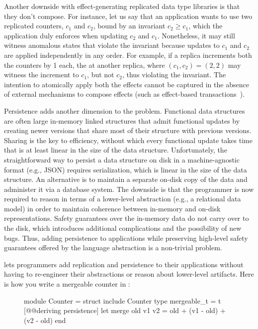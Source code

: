 Another downside with effect-generating replicated data type libraries
is that they don't compose. For instance, let us say that an
application wants to use two replicated counters, $c_1$ and $c_2$,
bound by an invariant $c_2 \ge c_1$, which the application duly
enforces when updating $c_2$ and $c_1$. Nonetheless, it may still
witness anomalous states that violate the invariant because updates to
$c_1$ and $c_2$ are applied independently in any order. For example,
if a replica increments both the counters by 1 each, the  at
another replica, where $(c_1,c_2) = (2,2)$ may witness the increment
to $c_1$, but not $c_2$, thus violating the invariant. The intention
to atomically apply both the effects cannot be captured in the absence
of external mechanisms to compose effects (such as effect-based
transactions~\cite{pldi15}).

Persistence adds another dimension to the problem. Functional data
structures are often large in-memory linked structures that admit
functional updates by creating newer versions that share most of their
structure with previous versions. Sharing is the key to efficiency,
without which every functional update takes time that is at least
linear in the size of the data structure. Unfortunately, the
straightforward way to persist a data structure on disk in a
machine-agnostic format (e.g., JSON) requires serialization, which is
linear in the size of the data structure. An alternative is to
maintain a separate on-disk copy of the data and administer it via a
database system. The downside is that the programmer is now required
to reason in terms of a lower-level abstraction (e.g., a relational
data model) in order to maintain coherence between in-memory and
on-disk representations. Safety guarantees over the in-memory data do
not carry over to the disk, which introduces additional complications
and the possibility of new bugs. Thus, adding persistence to
applications while preserving high-level safety guarantees offered by
the language abstraction is a non-trivial problem.

\name lets programmers add replication and persistence to their
applications without having to re-engineer their abstractions or
reason about lower-level artifacts. Here is how you write a mergeable
counter in \name:
\begin{figure}[!h]
  \begin{ocaml}
    module Counter = struct
      include Counter
      type mergeable_t = t [@@deriving persistence]
      let merge old v1 v2 = old + (v1 - old) + (v2 - old)
    end
  \end{ocaml}
\end{figure}


